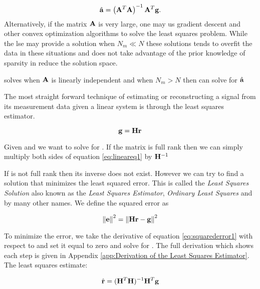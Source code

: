 \begin{equation}
	\hat{ \mathbf{a} } = \left( \mathbf{A}^T \mathbf{A} \right)^{-1} \mathbf{A}^T \mathbf{g}.
\end{equation}
Alternatively, if the matrix $\mathbf{A}$ is very large, one may us gradient descent and other convex optimization algorithms to solve the least squares problem. While the \gls{lse} may provide a solution when $N_m \ll N$ these solutions tends to overfit the data in these situations and does not take advantage of the prior knowledge of sparsity in reduce the solution space.

solves  when $\mathbf{A}$ is linearly independent and when $N_m > N$ then can solve for $\hat{ \mathbf{a} }$

The most straight forward technique of estimating or reconstructing a signal from its measurement data given a linear system is through the least squares estimator. 


\begin{equation}\label{eq:lineareq1}
	\mathbf{g} = \mathbf{Hr} 
\end{equation}

Given  and  we want to solve for . If the matrix is full rank then we can simply multiply both sides of equation \ref{eq:lineareq1} by $\mathbf{H}^{-1}$ 



If  is not full rank then its inverse does not exist. However we can try to find a solution  that minimizes the least squared error. This is called the \emph{Least Squares Solution} also known as the \emph{Least Squares Estimator}, \emph{Ordinary Least Squares} and by many other names. We define the squared error as

\begin{equation}\label{eq:squarederror1}
	\mathbf{ \lVert \mathbf{e} \rVert }^2 =    \mathbf{ \lVert \mathbf{Hr-g} \rVert }^2
\end{equation}

\noindent To minimize the error, we take the derivative of equation \ref{eq:squarederror1} with respect to  and set it equal to zero and solve for . The full derivation which shows each step is given in Appendix \ref{app:Derivation of the Least Squares Estimator}. The least squares estimate:

\begin{equation}
	\hat{ \mathbf{r} } = ( \mathbf{H}^T \mathbf{H} )^{-1} \mathbf{H}^T \mathbf{g}
\end{equation}




